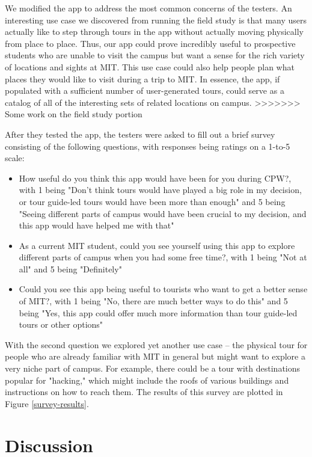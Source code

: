 \documentclass{sigchi}
\begin{document}
We modified the app to address the most common concerns of the testers. An interesting use case we discovered from running the field study is that many users actually like to step through tours in the app without actually moving physically from place to place. Thus, our app could prove incredibly useful to prospective students who are unable to visit the campus but want a sense for the rich variety of locations and sights at MIT. This use case could also help people plan what places they would like to visit during a trip to MIT. In essence, the app, if populated with a sufficient number of user-generated tours, could serve as a catalog of all of the interesting sets of related locations on campus.
>>>>>>> Some work on the field study portion

After they tested the app, the testers were asked to fill out a brief survey consisting of the following questions, with responses being ratings on a 1-to-5 scale:
\begin{itemize}
\item How useful do you think this app would have been for you during CPW?, with 1 being "Don't think tours would have played a big role in my decision, or tour guide-led tours would have been more than enough" and 5 being "Seeing different parts of campus would have been crucial to my decision, and this app would have helped me with that"
\item As a current MIT student, could you see yourself using this app to explore different parts of campus when you had some free time?, with 1 being "Not at all" and 5 being "Definitely"
\item Could you see this app being useful to tourists who want to get a better sense of MIT?, with 1 being "No, there are much better ways to do this" and 5 being "Yes, this app could offer much more information than tour guide-led tours or other options"
\end{itemize}
With the second question we explored yet another use case -- the physical tour for people who are already familiar with MIT in general but might want to explore a very niche part of campus. For example, there could be a tour with destinations popular for "hacking," which might include the roofs of various buildings and instructions on how to reach them. The results of this survey are plotted in Figure \ref{survey-results}.

\section{Discussion}
\end{document}
